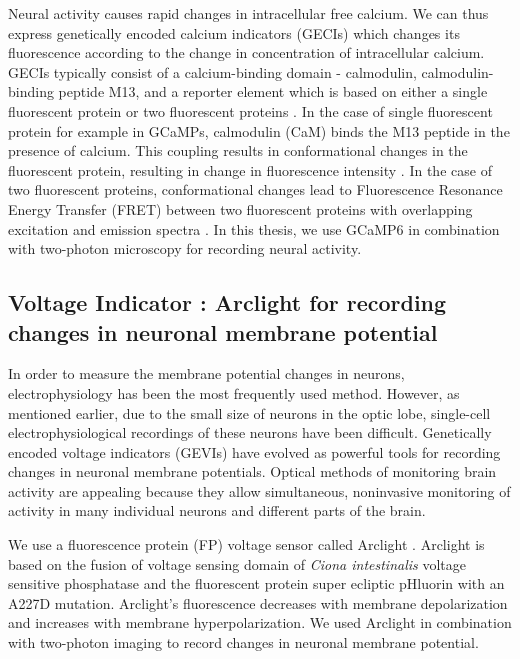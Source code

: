 Neural activity causes rapid changes in intracellular free calcium\parencite{Baker1971, Sabatini2002, Egelhaaf1995}. We can thus express genetically encoded calcium indicators (GECIs) which changes its fluorescence according to the change in concentration of intracellular calcium. GECIs typically consist of a calcium-binding domain - calmodulin, calmodulin-binding peptide M13, and a reporter element which is based on either a single fluorescent protein or two fluorescent proteins \parencite{Broussard2014}. In the case of single fluorescent protein for example in GCaMPs, calmodulin (CaM) binds the M13 peptide in the presence of calcium. This coupling results in conformational changes in the fluorescent protein, resulting in change in fluorescence intensity \parencite{Nagai2001}. In the case of two fluorescent proteins, conformational changes lead to Fluorescence Resonance Energy Transfer (FRET) between two fluorescent proteins with overlapping excitation and emission spectra \parencite{Miyawaki1997}. In this thesis, we use GCaMP6 \parencite{Chen2013} in combination with two-photon microscopy for recording neural activity.

\subsection{Voltage Indicator : Arclight for recording changes in neuronal membrane potential}
In order to measure the membrane potential changes in neurons, electrophysiology has been the most frequently used method. However, as mentioned earlier, due to the small size of neurons in the optic lobe, single-cell electrophysiological recordings of these neurons have been difficult. Genetically encoded voltage indicators (GEVIs) have evolved as powerful tools for recording changes in neuronal membrane potentials. Optical methods of monitoring brain activity are appealing because they allow simultaneous, noninvasive monitoring of activity in many individual neurons and different parts of the brain. 

We use a fluorescence protein (FP) voltage sensor called Arclight \parencite{Jin2012}. Arclight is based on the fusion of voltage sensing domain of \textit{Ciona intestinalis} voltage sensitive phosphatase \parencite{Murata2005} and the fluorescent protein super ecliptic pHluorin with an A227D mutation. Arclight's fluorescence decreases with membrane depolarization and increases with membrane hyperpolarization. We used Arclight in combination with two-photon imaging to record changes in neuronal membrane potential.


